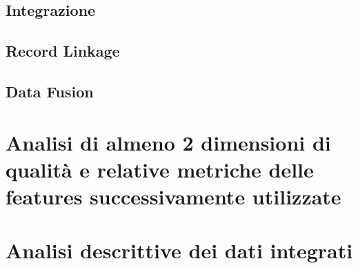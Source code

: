 \section{Integrazione}

\section{Record Linkage}

\section{Data Fusion}

\chapter{Analisi di almeno 2 dimensioni di qualità e relative metriche delle features successivamente utilizzate}
\chapter{Analisi descrittive dei dati integrati}
